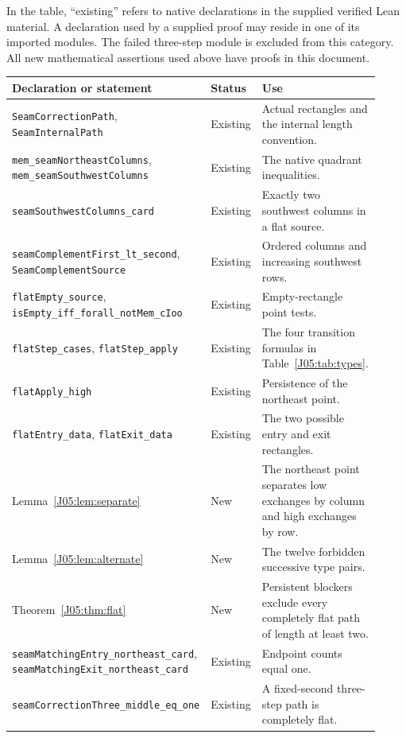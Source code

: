 \documentclass[11pt,oneside]{report}
\theoremstyle{definition}
\numberwithin{equation}{section}
\newcommand{\decl}[1]{\textnormal{\nolinkurl{#1}}}
\begin{document}
In the table, ``existing'' refers to native declarations in the supplied
verified Lean material. A declaration used by a supplied proof may reside in
one of its imported modules. The failed three-step module is excluded from
this category. All new mathematical assertions used above have proofs in
this document.

\small
\begin{longtable}{>{\raggedright\arraybackslash}p{0.44\linewidth}
                  >{\raggedright\arraybackslash}p{0.14\linewidth}
                  >{\raggedright\arraybackslash}p{0.34\linewidth}}
Declaration or statement & Status & Use\\\hline\endhead
\decl{SeamCorrectionPath}, \decl{SeamInternalPath}
& Existing & Actual rectangles and the internal length convention.\\
\decl{mem_seamNortheastColumns}, \decl{mem_seamSouthwestColumns}
& Existing & The native quadrant inequalities.\\
\decl{seamSouthwestColumns_card}
& Existing & Exactly two southwest columns in a flat source.\\
\decl{seamComplementFirst_lt_second}, \decl{SeamComplementSource}
& Existing & Ordered columns and increasing southwest rows.\\
\decl{flatEmpty_source}, \decl{isEmpty_iff_forall_notMem_cIoo}
& Existing & Empty-rectangle point tests.\\
\decl{flatStep_cases}, \decl{flatStep_apply}
& Existing & The four transition formulas in Table~\ref{J05:tab:types}.\\
\decl{flatApply_high}
& Existing & Persistence of the northeast point.\\
\decl{flatEntry_data}, \decl{flatExit_data}
& Existing & The two possible entry and exit rectangles.\\
Lemma~\ref{J05:lem:separate}
& New & The northeast point separates low exchanges by column and high exchanges by row.\\
Lemma~\ref{J05:lem:alternate}
& New & The twelve forbidden successive type pairs.\\
Theorem~\ref{J05:thm:flat}
& New & Persistent blockers exclude every completely flat path of length at least two.\\
\decl{seamMatchingEntry_northeast_card},
\decl{seamMatchingExit_northeast_card}
& Existing & Endpoint counts equal one.\\
\decl{seamCorrectionThree_middle_eq_one}
& Existing & A fixed-second three-step path is completely flat.\\

\end{longtable}
\end{document}
